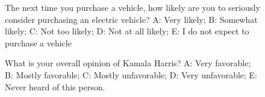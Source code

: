 \begin{figure}[!htbp]
    \centering
    \begin{minipage}{0.6\textwidth}
        \centering
    \hfill
    \end{minipage} 
    \begin{minipage}{0.2\textwidth}
    \end{minipage}
    
    \caption{The next time you purchase a vehicle, how likely are you to seriously consider purchasing an electric vehicle?
A: Very likely; B: Somewhat likely; C: Not too likely; D: Not at all likely; E: I do not expect to purchase a vehicle
}
\label{fig:example7}
\end{figure}

\begin{figure}[!htbp]
    \centering
    \begin{minipage}{0.6\textwidth}
        \centering
    \hfill
    \end{minipage} 
    \begin{minipage}{0.2\textwidth}
    \end{minipage}
    
    \caption{ What is your overall opinion of    Kamala Harris?
A: Very favorable; B: Mostly favorable; C: Mostly unfavorable; D: Very unfavorable; E: Never heard of this person.
}
\label{fig:example8}
\end{figure}

